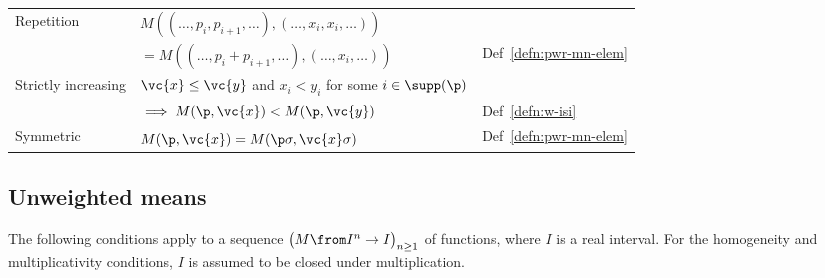 \begin{center}
\begin{tabular}{lll}
\hline
Repetition      &
$M((\ldots, p_i, p_{i + 1}, \ldots), 
(\ldots, x_i, x_i, \ldots))$
&
\\
&
$= M((\ldots, p_i + p_{i + 1}, \ldots), 
(\ldots, x_i, \ldots))$
&
Def~\ref{defn:pwr-mn-elem}       \\[\tsk]
Strictly increasing     &
$\vc{x} \leq \vc{y}$ and $x_i < y_i$ for some $i \in \supp(\p)$   &
\\
&
$\implies M(\p, \vc{x}) < M(\p, \vc{y})$     &
Def~\ref{defn:w-isi}     \\[\tsk]
Symmetric       & 
$M(\p, \vc{x}) = M(\p\sigma, \vc{x}\sigma)\vphantom{X^{X^{X^X}}}$   &
Def~\ref{defn:pwr-mn-elem}       \\[\tsk]
\hline
\end{tabular}
\end{center}

\subsection*{Unweighted means}

The following conditions apply to a sequence 
$
\bigl(M \from I^n \to I\bigr)_{n \geq 1}
$
of functions,
where $I$ is a real interval.  For the homogeneity and multiplicativity
conditions, $I$ is assumed to be closed under multiplication.

